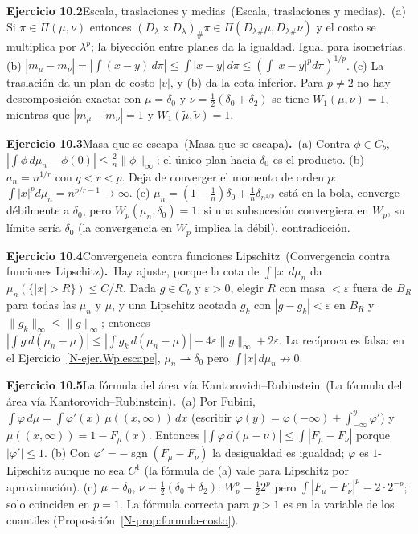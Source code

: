 \documentclass[11pt,a4paper]{amsart}
\newcommand{\ve}{\varepsilon}
\theoremstyle{remark}
\theoremstyle{definition}
\numberwithin{subsection}{section}
\numberwithin{equation}{section}
\newcommand{\ejlabel}[2]{\par\medskip\noindent\textbf{Ejercicio #1}\ifx\relax#2\relax\else\ (#2)\fi\textbf{.}\ }
\begin{document}
\ejlabel{10.2}{Escala, traslaciones y medias}(a) Si $\pi\in\Pi(\mu,\nu)$ entonces $(D_\lambda\times D_\lambda)_\#\pi\in\Pi(D_{\lambda\#}\mu,D_{\lambda\#}\nu)$ y el costo se multiplica por $\lambda^p$; la biyección entre planes da la igualdad. Igual para isometrías. (b) $|m_\mu-m_\nu|=|\int(x-y)\,d\pi|\le\int|x-y|\,d\pi\le(\int|x-y|^pd\pi)^{1/p}$. (c) La traslación da un plan de costo $|v|$, y (b) da la cota inferior. Para $p\ne2$ no hay descomposición exacta: con $\mu=\delta_0$ y $\nu=\frac12(\delta_0+\delta_2)$ se tiene $W_1(\mu,\nu)=1$, mientras que $|m_\mu-m_\nu|=1$ y $W_1(\tilde\mu,\tilde\nu)=1$.

\ejlabel{10.3}{Masa que se escapa}(a) Contra $\phi\in C_b$, $|\int\phi\,d\mu_n-\phi(0)|\le\frac2n\|\phi\|_\infty$; el único plan hacia $\delta_0$ es el producto. (b) $a_n=n^{1/r}$ con $q<r<p$. Deja de converger el momento de orden $p$: $\int|x|^pd\mu_n=n^{p/r-1}\to\infty$. (c) $\mu_n=(1-\frac1n)\delta_0+\frac1n\delta_{n^{1/p}}$ está en la bola, converge débilmente a $\delta_0$, pero $W_p(\mu_n,\delta_0)=1$: si una subsucesión convergiera en $W_p$, su límite sería $\delta_0$ (la convergencia en $W_p$ implica la débil), contradicción.

\ejlabel{10.4}{Convergencia contra funciones Lipschitz}Hay ajuste, porque la cota de $\int|x|\,d\mu_n$ da
$\mu_n(\{|x|>R\})\le C/R$. Dada $g\in C_b$ y $\ve>0$, elegir $R$ con masa $<\ve$ fuera de $B_R$ para todas las $\mu_n$ y $\mu$, y una Lipschitz acotada $g_k$ con $|g-g_k|<\ve$ en $B_R$ y $\|g_k\|_\infty\le\|g\|_\infty$; entonces $|\int g\,d(\mu_n-\mu)|\le|\int g_k\,d(\mu_n-\mu)|+4\ve\|g\|_\infty+2\ve$. La recíproca es falsa: en el Ejercicio~\ref{N-ejer.Wp.escape}, $\mu_n\rightharpoonup\delta_0$ pero $\int|x|\,d\mu_n\not\to0$.

\ejlabel{10.5}{La fórmula del área vía Kantorovich--Rubinstein}(a) Por Fubini, $\int\varphi\,d\mu=\int\varphi'(x)\,\mu((x,\infty))\,dx$ (escribir $\varphi(y)=\varphi(-\infty)+\int_{-\infty}^y\varphi'$) y $\mu((x,\infty))=1-F_\mu(x)$. Entonces $|\int\varphi\,d(\mu-\nu)|\le\int|F_\mu-F_\nu|$ porque $|\varphi'|\le1$. (b) Con $\varphi'=-\operatorname{sgn}(F_\mu-F_\nu)$ la desigualdad es igualdad; $\varphi$ es $1$-Lipschitz aunque no sea $C^1$ (la fórmula de (a) vale para Lipschitz por aproximación). (c) $\mu=\delta_0$, $\nu=\frac12(\delta_0+\delta_2)$: $W_p^p=\frac122^p$ pero $\int|F_\mu-F_\nu|^p=2\cdot2^{-p}$; solo coinciden en $p=1$. La fórmula correcta para $p>1$ es en la variable de los cuantiles (Proposición~\ref{N-prop:formula-costo}).
\end{document}

